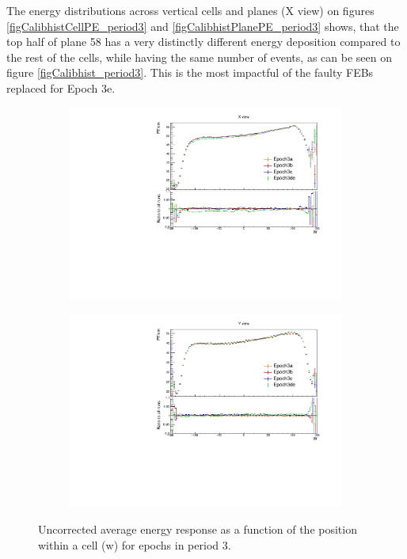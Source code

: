 \documentclass[12pt,a4paper]{article}
\begin{document}
The energy distributions across vertical cells and planes (X view) on figures \ref{figCalibhistCellPE_period3} and \ref{figCalibhistPlanePE_period3} shows, that the top half of plane 58 has a very distinctly different energy deposition compared to the rest of the cells, while having the same number of events, as can be seen on figure \ref{figCalibhist_period3}. This is the most impactful of the faulty FEBs replaced for Epoch 3e.

\begin{figure}[!hbtp]
\centering
\begin{subfigure}[b]{0.495\textwidth}
\centering
\includegraphics[width=\textwidth]{Plots/Attenprofs_P3Data_WPE_corr_xy_X_Combined.pdf}
\end{subfigure}
\begin{subfigure}[b]{0.495\textwidth}
\centering
\includegraphics[width=\textwidth]{Plots/Attenprofs_P3Data_WPE_corr_xy_Y_Combined.pdf}
\end{subfigure}
\caption{Uncorrected average energy response as a function of the position within a cell (w) for epochs in period 3.}
\label{figCalibhistWPE_period3}
\end{figure}
\end{document}
